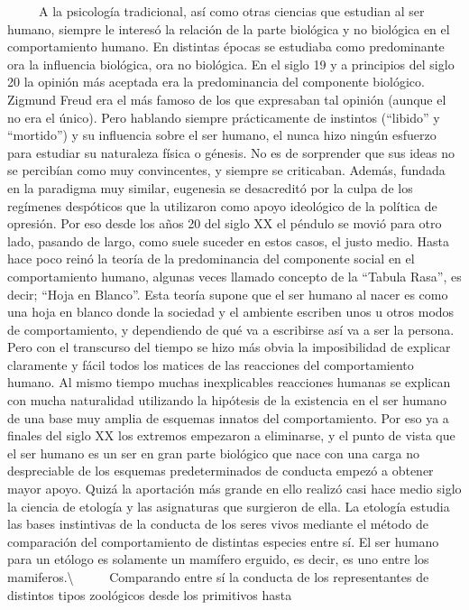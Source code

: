 ~ ~ ~ A la psicología tradicional, así como otras ciencias que estudian
al ser humano, siempre le interesó la relación de la parte biológica y
no biológica en el comportamiento humano. En distintas épocas se
estudiaba como predominante ora la influencia biológica, ora no
biológica. En el siglo 19 y a principios del siglo 20 la opinión más
aceptada era la predominancia del componente biológico. Zigmund Freud
era el más famoso de los que expresaban tal opinión (aunque el no era el
único). Pero hablando siempre prácticamente de instintos (``libido'' y
``mortido'') y su influencia sobre el ser humano, el nunca hizo ningún
esfuerzo para estudiar su naturaleza física o génesis. No es de
sorprender que sus ideas no se percibían como muy convincentes, y
siempre se criticaban. Además, fundada en la paradigma muy similar,
eugenesia se desacreditó por la culpa de los regímenes despóticos que la
utilizaron como apoyo ideológico de la política de opresión. Por eso
desde los años 20 del siglo XX el péndulo se movió para otro lado,
pasando de largo, como suele suceder en estos casos, el justo medio.
Hasta hace poco reinó la teoría de la predominancia del componente
social en el comportamiento humano, algunas veces llamado concepto de la
``Tabula Rasa'', es decir; ``Hoja en Blanco''. Esta teoría supone que el
ser humano al nacer es como una hoja en blanco donde la sociedad y el
ambiente escriben unos u otros modos de comportamiento, y dependiendo de
qué va a escribirse así va a ser la persona. Pero con el transcurso del
tiempo se hizo más obvia la imposibilidad de explicar claramente y fácil
todos los matices de las reacciones del comportamiento humano. Al mismo
tiempo muchas inexplicables reacciones humanas se explican con mucha
naturalidad utilizando la hipótesis de la existencia en el ser humano de
una base muy amplia de esquemas innatos del comportamiento. Por eso ya a
finales del siglo XX los extremos empezaron a eliminarse, y el punto de
vista que el ser humano es un ser en gran parte biológico que nace con
una carga no despreciable de los esquemas predeterminados de conducta
empezó a obtener mayor apoyo. Quizá la aportación más grande en ello
realizó casi hace medio siglo la ciencia de etología y las asignaturas
que surgieron de ella. La etología estudia las bases instintivas de la
conducta de los seres vivos mediante el método de comparación del
comportamiento de distintas especies entre sí. El ser humano para un
etólogo es solamente un mamífero erguido, es decir, es uno entre los
mamiferos.\textbackslash{} ~ ~ ~ Comparando entre sí la conducta de los
representantes de distintos tipos zoológicos desde los primitivos hasta
